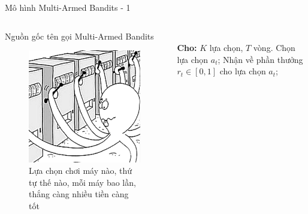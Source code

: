 \begin{frame}{Mô hình Multi-Armed Bandits - 1}
    \begin{columns}
        \begin{column}{0.45\textwidth}
            \begin{block}{Nguồn gốc tên gọi Multi-Armed Bandits}
                \begin{figure}
                    \centering
                    \includegraphics[width=0.7\linewidth]{figure/preliminary/multi-armed-octopus.jpg}
                    \caption{Lựa chọn chơi máy nào, thứ tự thế nào, mỗi máy bao lần, thắng càng nhiều tiền càng tốt}
                    \label{fig:preliminary:mab}
                \end{figure}
            \end{block}
        \end{column}
        \begin{column}{0.45\textwidth}
            \begin{algorithm}[H]
                \fontsize{8pt}{10}\selectfont
                \caption{\fontsize{8pt}{10}\selectfont Mô hình Multi-armed bandits}
                \begin{algorithmic}[1]
                    \\
                    \textbf{Cho:} $K$ lựa chọn, $T$ vòng.
                        \State Chọn lựa chọn $a_t$;
                        \State Nhận về phần thưởng $r_t \in [0, 1]$ cho lựa chọn $a_t$;
                    \EndFor
                \end{algorithmic}
                \label{alg:preliminary:mab}
            \end{algorithm}
        \end{column}
    \end{columns}
\end{frame}

